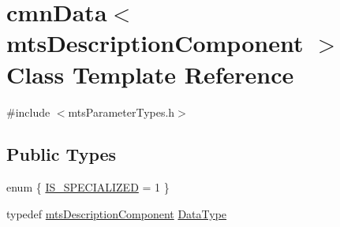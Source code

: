 \hypertarget{classcmn_data_3_01mts_description_component_01_4}{}\section{cmn\+Data$<$ mts\+Description\+Component $>$ Class Template Reference}
\label{classcmn_data_3_01mts_description_component_01_4}


{\ttfamily \#include $<$mts\+Parameter\+Types.\+h$>$}

\subsection*{Public Types}
\begin{DoxyCompactItemize}
\item 
enum \{ \hyperlink{classcmn_data_3_01mts_description_component_01_4_a5d03da76205e0d9dc3d32117ac2dcdbca534c6cc3ad48f4c52903e2e8a6bdd2dd}{I\+S\+\_\+\+S\+P\+E\+C\+I\+A\+L\+I\+Z\+E\+D} = 1
 \}
\item 
typedef \hyperlink{classmts_description_component}{mts\+Description\+Component} \hyperlink{classcmn_data_3_01mts_description_component_01_4_a5b51d26c4705dfe39a45243a2a4023dc}{Data\+Type}
\end{DoxyCompactItemize}
